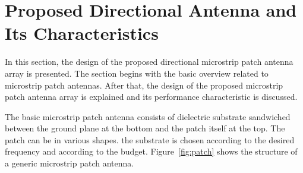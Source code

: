 \documentclass[12pt, oneandhalf, chaparabic, sees, ms]{metu}
\begin{document}
% 
% 
% 
% 
% 
% 
% 
% 
% 
% 



\chapter{Proposed Directional Antenna and Its Characteristics}\label{cpropdant}

In this section, the design of the proposed directional microstrip patch antenna array is presented. 
The section begins with the basic overview related to microstrip patch antennas.
After that, the design of the proposed microstrip patch antenna array is explained and its performance characteristic is discussed. 

The basic microstrip patch antenna consists of dielectric substrate
sandwiched between the ground plane at the bottom and the patch itself at the top. 
The patch can be in various shapes. the substrate is chosen according to the desired frequency and according to the budget. 
Figure~\ref{fig:patch} shows the structure of a generic microstrip patch antenna.
\end{document}
